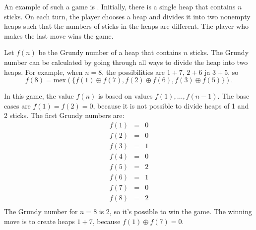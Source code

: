 
An example of such a game is .
Initially, there is a single heap that contains $n$ sticks.
On each turn, the player chooses a heap and divides
it into two nonempty heaps such that the numbers of
sticks in the heaps are different.
The player who makes the last move wins the game.

Let $f(n)$ be the Grundy number of a heap
that contains $n$ sticks.
The Grundy number can be calculated by going
through all ways to divide the heap into
two heaps.
For example, when $n=8$, the possibilities
are $1+7$, $2+6$ ja $3+5$, so
\[f(8)=\textrm{mex}(\{f(1) \oplus f(7), f(2) \oplus f(6), f(3) \oplus f(5)\}).\]

In this game, the value $f(n)$ is based on values
$f(1),\ldots,f(n-1)$.
The base cases are $f(1)=f(2)=0$,
because it is not possible to divide heaps
of 1 and 2 sticks.
The first Grundy numbers are:
\[
\begin{array}{lcl}
f(1) & = & 0 \\
f(2) & = & 0 \\
f(3) & = & 1 \\
f(4) & = & 0 \\
f(5) & = & 2 \\
f(6) & = & 1 \\
f(7) & = & 0 \\
f(8) & = & 2 \\
\end{array}
\]
The Grundy number for $n=8$ is 2,
so it's possible to win the game.
The winning move is to create heaps
$1+7$, because $f(1) \oplus f(7) = 0$.

